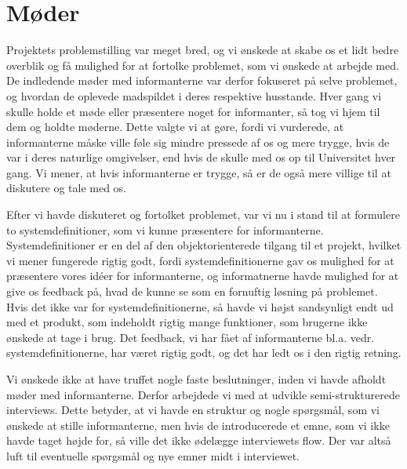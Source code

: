 \section{Møder}
Projektets problemstilling var meget bred, og vi ønskede at skabe os et lidt bedre overblik og få mulighed for at fortolke problemet, som vi ønskede at arbejde med. De indledende møder med informanterne var derfor fokuseret på selve problemet, og hvordan de oplevede madspildet i deres respektive husstande. Hver gang vi skulle holde et møde eller præsentere noget for informanter, så tog vi hjem til dem og holdte møderne. Dette valgte vi at gøre, fordi vi vurderede, at informanterne måske ville føle sig mindre pressede af os og mere trygge, hvis de var i deres naturlige omgivelser, end hvis de skulle med os op til Universitet hver gang. Vi mener, at hvis informanterne er trygge, så er de også mere villige til at diskutere og tale med os.

Efter vi havde diskuteret og fortolket problemet, var vi nu i stand til at formulere to systemdefinitioner, som vi kunne præsentere for informanterne. Systemdefinitioner er en del af den objektorienterede tilgang til et projekt, hvilket vi mener fungerede rigtig godt, fordi systemdefinitionerne gav os mulighed for at præsentere vores idéer for informanterne, og informatnerne havde mulighed for at give os feedback på, hvad de kunne se som en fornuftig løsning på problemet. Hvis det ikke var for systemdefinitionerne, så havde vi højst sandsynligt endt ud med et produkt, som indeholdt rigtig mange funktioner, som brugerne ikke ønskede at tage i brug. Det feedback, vi har fået af informanterne bl.a. vedr. systemdefinitionerne, har været rigtig godt, og det har ledt os i den rigtig retning. 

Vi ønskede ikke at have truffet nogle faste beslutninger, inden vi havde afholdt møder med informanterne. Derfor arbejdede vi med at udvikle semi-strukturerede interviews. Dette betyder, at vi havde en struktur og nogle spørgsmål, som vi ønskede at stille informanterne, men hvis de introducerede et emne, som vi ikke havde taget højde for, så ville det ikke ødelægge interviewets flow. Der var altså luft til eventuelle spørgsmål og nye emner midt i interviewet.


